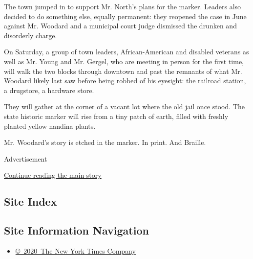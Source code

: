 The town jumped in to support Mr. North's plans for the marker. Leaders
also decided to do something else, equally permanent: they reopened the
case in June against Mr. Woodard and a municipal court judge dismissed
the drunken and disorderly charge.

On Saturday, a group of town leaders, African-American and disabled
veterans as well as Mr. Young and Mr. Gergel, who are meeting in person
for the first time, will walk the two blocks through downtown and past
the remnants of what Mr. Woodard likely last saw before being robbed of
his eyesight: the railroad station, a drugstore, a hardware store.

They will gather at the corner of a vacant lot where the old jail once
stood. The state historic marker will rise from a tiny patch of earth,
filled with freshly planted yellow nandina plants.

Mr. Woodard's story is etched in the marker. In print. And Braille.

Advertisement

\protect\hyperlink{after-bottom}{Continue reading the main story}

\hypertarget{site-index}{%
\subsection{Site Index}\label{site-index}}

\hypertarget{site-information-navigation}{%
\subsection{Site Information
Navigation}\label{site-information-navigation}}

\begin{itemize}
\tightlist
\item
  \href{https://help.nytimes3xbfgragh.onion/hc/en-us/articles/115014792127-Copyright-notice}{©~2020~The
  New York Times Company}
\end{itemize}

